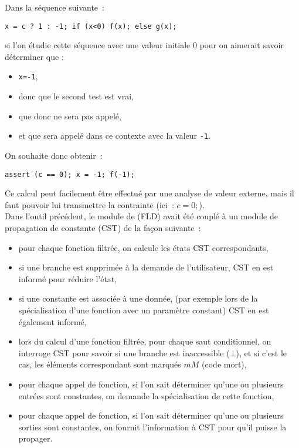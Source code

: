 \begin{exemple}
Dans la séquence suivante~:
\begin{center}
  \verb!x = c ? 1 : -1; if (x<0) f(x); else g(x); !
\end{center}
si l'on étudie cette séquence avec une valeur initiale 0 pour 
on aimerait savoir déterminer que :
\begin{itemize}
\item \verb!x=-1!,
\item donc que le second test est vrai,
\item que donc  ne sera pas appelé,
\item et que  sera appelé dans ce contexte avec la valeur \verb!-1!.\\
\end{itemize}

On souhaite donc obtenir~:
\begin{center}
  \verb!assert (c == 0); x = -1; f(-1); !
\end{center}
\end{exemple}

Ce calcul peut facilement être effectué par une analyse de valeur externe,
mais il faut pouvoir lui transmettre la contrainte (ici~: $c=0;$).\\


Dans l'outil précédent, le module de \slicing (FLD) avait été couplé à
un module de propagation de constante (CST) de la façon suivante~:
\begin{itemize}
  \item pour chaque fonction filtrée, on calcule les états CST correspondants,
  \item si une branche est supprimée à la demande de l'utilisateur,
    CST en est informé pour réduire l'état,
  \item si une constante est associée à une donnée,
    (par exemple lors de la spécialisation d'une fonction avec un paramètre
constant)
    CST en est également informé,
  \item lors du calcul d'une fonction filtrée, pour chaque saut conditionnel,
    on interroge CST pour savoir si une branche est inaccessible ($\bot$),
    et si c'est le cas, les éléments correspondant sont marqués $mM$ (code
    mort),
  \item pour chaque appel de fonction, si l'on sait déterminer qu'une ou
    plusieurs entrées sont constantes, on demande la spécialisation de cette
    fonction,
  \item pour chaque appel de fonction, si l'on sait déterminer qu'une ou
    plusieurs sorties sont constantes, on fournit l'information à CST pour qu'il
    puisse la propager.
\end{itemize}

